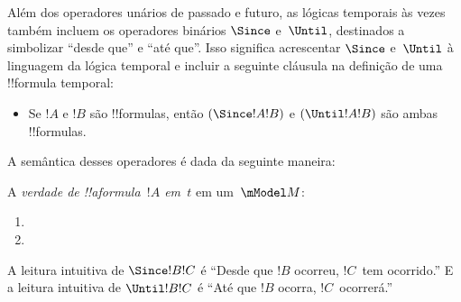 \documentclass[../../../include/open-logic-section]{subfiles}
\begin{document}


Além dos operadores unários de passado e futuro, as lógicas temporais
às vezes também incluem os operadores binários $\Since $ e~$\Until$,
destinados a simbolizar ``desde que'' e ``até que''. Isso significa
acrescentar $\Since $ e~$\Until$ à linguagem da lógica temporal e
incluir a seguinte cláusula na definição de uma !!{formula} temporal:

\begin{itemize}
\item[] Se $!A$ e $!B$ são !!{formula}s, então $(\Since  !A !B)$ e
  $(\Until !A !B)$ são ambas !!{formula}s.
\end{itemize}

A semântica desses operadores é dada da seguinte maneira:

\begin{defn}
  A \emph{verdade de !!a{formula}~$!A$ em~$t$} em um~$\mModel M$:
  \begin{enumerate}
  \item{} 
   \item{} 
  \end{enumerate} 
\end{defn}

A leitura intuitiva de $\Since  !B !C$ é ``Desde que $!B$ ocorreu,
$!C$~tem ocorrido.'' E a leitura intuitiva de $\Until !B !C$
é ``Até que $!B$ ocorra, $!C$~ocorrerá.''
\end{document}
